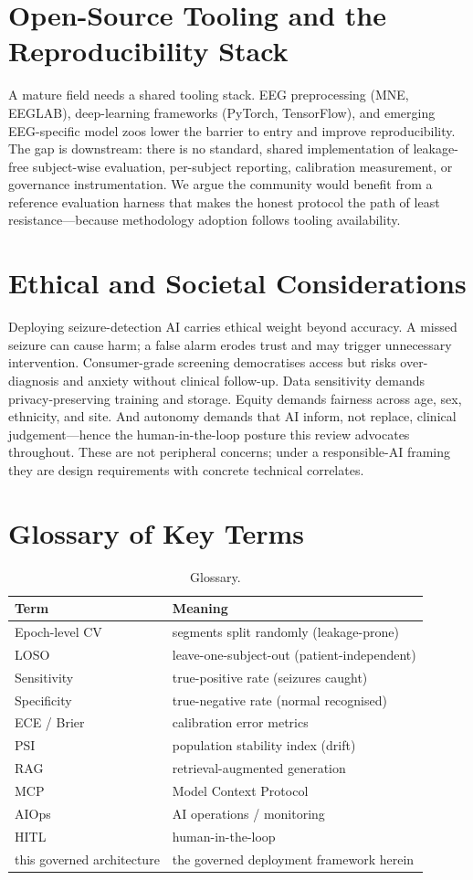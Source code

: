 \section{Open-Source Tooling and the Reproducibility Stack}
A mature field needs a shared tooling stack. EEG preprocessing (MNE, EEGLAB), deep-learning frameworks (PyTorch, TensorFlow), and emerging EEG-specific model zoos lower the barrier to entry and improve reproducibility. The gap is downstream: there is no standard, shared implementation of leakage-free subject-wise evaluation, per-subject reporting, calibration measurement, or governance instrumentation. We argue the community would benefit from a reference evaluation harness that makes the honest protocol the path of least resistance---because methodology adoption follows tooling availability.

\section{Ethical and Societal Considerations}
Deploying seizure-detection AI carries ethical weight beyond accuracy. A missed seizure can cause harm; a false alarm erodes trust and may trigger unnecessary intervention. Consumer-grade screening democratises access but risks over-diagnosis and anxiety without clinical follow-up. Data sensitivity demands privacy-preserving training and storage. Equity demands fairness across age, sex, ethnicity, and site. And autonomy demands that AI inform, not replace, clinical judgement---hence the human-in-the-loop posture this review advocates throughout. These are not peripheral concerns; under a responsible-AI framing they are design requirements with concrete technical correlates.

\section{Glossary of Key Terms}
\begin{table}[h]\centering\caption{Glossary.}\label{tab:gloss}
\footnotesize\begin{tabular}{ll}\toprule
Term & Meaning\\\midrule
Epoch-level CV & segments split randomly (leakage-prone)\\
LOSO & leave-one-subject-out (patient-independent)\\
Sensitivity & true-positive rate (seizures caught)\\
Specificity & true-negative rate (normal recognised)\\
ECE / Brier & calibration error metrics\\
PSI & population stability index (drift)\\
RAG & retrieval-augmented generation\\
MCP & Model Context Protocol\\
AIOps & AI operations / monitoring\\
HITL & human-in-the-loop\\
this governed architecture & the governed deployment framework herein\\\bottomrule
\end{tabular}\end{table}
